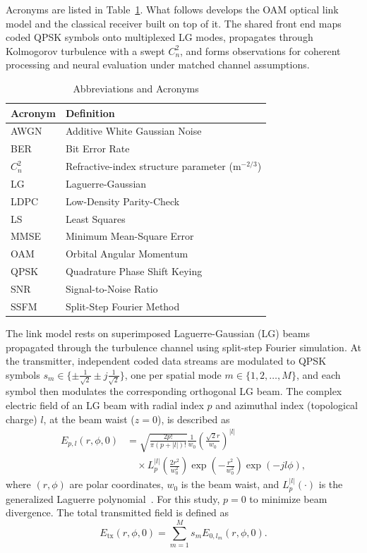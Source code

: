 \documentclass[journal]{IEEEtran}
\begin{document}
Acronyms are listed in Table~\ref{tab:abbreviations}. What follows develops the OAM optical link model and the classical receiver built on top of it. The shared front end maps coded QPSK symbols onto multiplexed LG modes, propagates through Kolmogorov turbulence with a swept $C_n^2$, and forms observations for coherent processing and neural evaluation under matched channel assumptions.

\begin{table}[htbp]
\centering
\caption{Abbreviations and Acronyms}
\label{tab:abbreviations}
\small
\renewcommand{\arraystretch}{1.1}
\begin{tabular}{ll}
\toprule
\textbf{Acronym} & \textbf{Definition} \\
\midrule
AWGN & Additive White Gaussian Noise \\
BER & Bit Error Rate \\
$C_n^2$ & Refractive-index structure parameter (m$^{-2/3}$) \\
LG & Laguerre-Gaussian \\
LDPC & Low-Density Parity-Check \\
LS & Least Squares \\
MMSE & Minimum Mean-Square Error \\
OAM & Orbital Angular Momentum \\
QPSK & Quadrature Phase Shift Keying \\
SNR & Signal-to-Noise Ratio \\
SSFM & Split-Step Fourier Method \\
\bottomrule
\end{tabular}
\end{table}


The link model rests on superimposed Laguerre-Gaussian (LG) beams propagated through the turbulence channel using split-step Fourier simulation. At the transmitter, independent coded data streams are modulated to QPSK symbols $s_m \in \{ \pm \frac{1}{\sqrt{2}} \pm j\frac{1}{\sqrt{2}} \}$, one per spatial mode $m \in \{1, 2, \dots, M\}$, and each symbol then modulates the corresponding orthogonal LG beam. The complex electric field of an LG beam with radial index $p$ and azimuthal index (topological charge) $l$, at the beam waist ($z=0$), is described as
\begin{equation}
\label{eq:lg_beam}
\begin{split}
    E_{p,l}(r, \phi, 0) &= \sqrt{\frac{2 p!}{\pi (p + |l|)!}} \frac{1}{w_0} \left( \frac{\sqrt{2} r}{w_0} \right)^{|l|} \\
    &\quad \times L_p^{|l|}\left( \frac{2 r^2}{w_0^2} \right) \exp\left( -\frac{r^2}{w_0^2} \right) \exp(-j l \phi),
\end{split}
\end{equation}
where $(r, \phi)$ are polar coordinates, $w_0$ is the beam waist, and $L_p^{|l|}(\cdot)$ is the generalized Laguerre polynomial~\cite{allen1992orbital}. For this study, $p=0$ to minimize beam divergence. The total transmitted field is defined as
\begin{equation}
\label{eq:tx_field}
    E_{\mathrm{tx}}(r, \phi, 0) = \sum_{m=1}^{M} s_m E_{0, l_m}(r, \phi, 0).
\end{equation}
\end{document}
